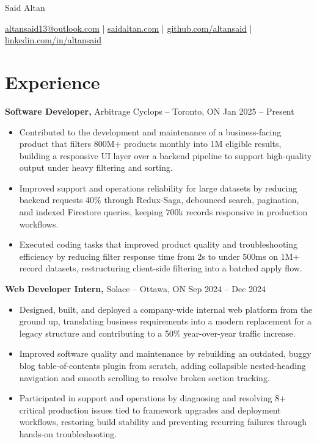 \documentclass[11pt]{article}       %
\begin{document}
\centerline{\Huge Said Altan}

\vspace{10pt}

\centerline{\href{mailto:altansaid13@outlook.com}{altansaid13@outlook.com} | \href{https://saidaltan.com}{saidaltan.com} | \href{https://github.com/altansaid}{github.com/altansaid} | \href{https://www.linkedin.com/in/altansaid}{linkedin.com/in/altansaid}}


\vspace{5pt}
\section*{Experience}
\textbf{Software Developer,} {Arbitrage Cyclops} -- Toronto, ON \hfill Jan 2025 -- Present \\
\vspace{-9pt}
\begin{itemize}
  \item Contributed to the development and maintenance of a business-facing product that filters 800M+ products monthly into 1M eligible results, building a responsive UI layer over a backend pipeline to support high-quality output under heavy filtering and sorting.
  \item Improved support and operations reliability for large datasets by reducing backend requests 40\% through Redux-Saga, debounced search, pagination, and indexed Firestore queries, keeping 700k records responsive in production workflows.
  \item Executed coding tasks that improved product quality and troubleshooting efficiency by reducing filter response time from 2s to under 500ms on 1M+ record datasets, restructuring client-side filtering into a batched apply flow.
\end{itemize}

\textbf{Web Developer Intern,} {Solace} -- Ottawa, ON \hfill Sep 2024 -- Dec 2024 \\
\vspace{-9pt}
\begin{itemize}
  \item Designed, built, and deployed a company-wide internal web platform from the ground up, translating business requirements into a modern replacement for a legacy structure and contributing to a 50\% year-over-year traffic increase.
  \item Improved software quality and maintenance by rebuilding an outdated, buggy blog table-of-contents plugin from scratch, adding collapsible nested-heading navigation and smooth scrolling to resolve broken section tracking.
  \item Participated in support and operations by diagnosing and resolving 8+ critical production issues tied to framework upgrades and deployment workflows, restoring build stability and preventing recurring failures through hands-on troubleshooting.
\end{itemize}
\end{document}
